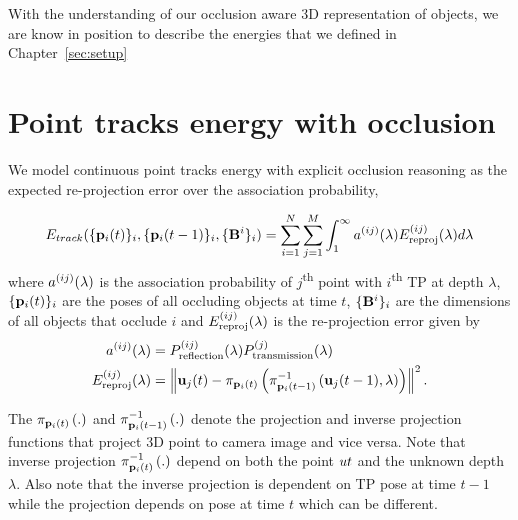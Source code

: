With the understanding of our occlusion aware 3D representation of objects, we are know in position to describe the energies that we defined in Chapter~\ref{sec:setup}

\section{Point tracks energy with occlusion}
\label{sec:totalContPtTracksEnergy}
We model continuous point tracks energy with explicit occlusion reasoning as
the expected re-projection error over the association probability,

\begin{align}
  E_{track}(\{ \mathbf{p}_{i}({t}) \}_i, \{ \mathbf{p}_{i}({t-1}) \}_i, \{\mathbf{B}^{i}\}_i ) = 
    \sum_{i=1}^{N} 
    \sum_{j = 1}^{M}
    \int_1^\infty a^{(ij)}(\lambda)E^{(ij)}_{\text{reproj}}(\lambda) d\lambda
\end{align}
where $a^{(ij)}(\lambda)$ is the association probability of
$j$\textsuperscript{th} point with $i$\textsuperscript{th} TP at depth $\lambda$, $\{ \mathbf{p}_{i}({t}) \}_i$ are the poses of all occluding objects at time $t$, $ \{ \mathbf{B}^{i} \}_i$ are the dimensions of all objects that occlude $i$
and $E^{(ij)}_{\text{reproj}}(\lambda)$ is the re-projection error given by
%
\begin{align}
  a^{(ij)}(\lambda) &= P^{(ij)}_{\text{reflection}}(\lambda)P^{(j)}_{\text{transmission}}(\lambda)\\
  E^{(ij)}_{\text{reproj}}(\lambda) &= \left\|\mathbf{u}_j(t) - \pi_{\mathbf{p}_{i}({t})}\left(\pi^{-1}_{\mathbf{p}_{i}({t-1})}\left(\mathbf{u}_j(t-1), \lambda\right)\right)\right\|^2 .
  \label{eq:reprojerror}
\end{align}

The  $\pi_{\mathbf{p}_{i}({t})}\left(.\right)$ and $\pi^{-1}_{\mathbf{p}_{i}({t-1})}\left(.\right)$ denote the projection and
inverse projection functions that project 3D point to camera image and vice
versa. Note that inverse projection $\pi^{-1}_{\mathbf{p}_{i}({t})}\left(.\right)$ depend on both the
point $ut$ and the unknown depth $\lambda$. Also note that the inverse projection is dependent on TP pose at time $t-1$ while the projection depends on pose at time $t$ which can be different.

